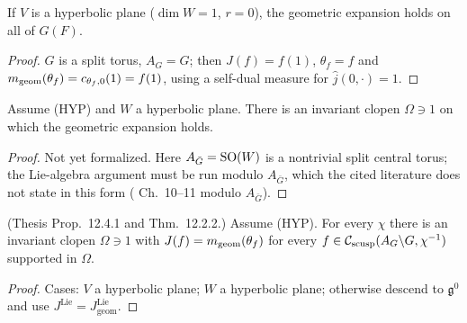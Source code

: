 \begin{lemma}
\label{geomAt_near_of_isHypPlane_V}
\leanok
{}
If $V$ is a hyperbolic plane ($\dim W=1$, $r=0$), the geometric expansion holds on all of $G(F)$.
\end{lemma}
\begin{proof}
\leanok
{}
$G$ is a split torus, $A_G=G$; then $J(f)=f(1)$, $\theta_f=f$ and $m_{\mathrm{geom}}(\theta_f)=c_{\theta_f,0}(1)=f(1)$, using a self-dual measure for $\hat j(0,\cdot)=1$.
\end{proof}

\begin{lemma}
\label{geomAt_near_of_isHypPlane_W}
\leanok
{}
Assume (HYP) and $W$ a hyperbolic plane. There is an invariant clopen $\Omega\ni1$ on which the geometric
expansion holds.
\end{lemma}
\begin{proof}
Not yet formalized. Here $A_{\bar G}=\mathrm{SO}(W)$ is a nontrivial split central torus; the Lie-algebra argument must be
run modulo $A_{\bar G}$, which the cited literature does not state in this form (\cite{BP} Ch.~10--11 modulo $A_{\bar G}$).
\end{proof}

\begin{theorem}
\label{geomAt_near}
\leanok
{}
(Thesis Prop.~12.4.1 and Thm.~12.2.2.) Assume (HYP). For every $\chi$ there is an invariant clopen $\Omega\ni1$
with $J(f)=m_{\mathrm{geom}}(\theta_f)$ for every $f\in\mathcal{C}_{\mathrm{scusp}}(A_G\backslash G,\chi^{-1})$ supported in $\Omega$.
\end{theorem}
\begin{proof}
\leanok
{}
Cases: $V$ a hyperbolic plane; $W$ a hyperbolic plane; otherwise descend to $\mathfrak g^0$ and use $J^{\mathrm{Lie}}=J^{\mathrm{Lie}}_{\mathrm{geom}}$.
\end{proof}


